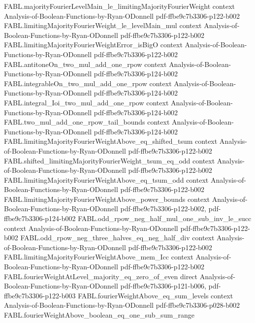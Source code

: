 \begin{theorem}
\proofstep
  {FABL.majorityFourierLevelMain_le_limitingMajorityFourierWeight}
  {context}
  {Analysis-of-Boolean-Functions-by-Ryan-ODonnell}
  {pdf-ffbe9c7b3306-p122-b002}
\proofstep
  {FABL.limitingMajorityFourierWeight_le_levelMain_mul}
  {context}
  {Analysis-of-Boolean-Functions-by-Ryan-ODonnell}
  {pdf-ffbe9c7b3306-p122-b002}
\proofstep
  {FABL.limitingMajorityFourierWeightError_isBigO}
  {context}
  {Analysis-of-Boolean-Functions-by-Ryan-ODonnell}
  {pdf-ffbe9c7b3306-p122-b002}
\proofstep
  {FABL.antitoneOn_two_mul_add_one_rpow}
  {context}
  {Analysis-of-Boolean-Functions-by-Ryan-ODonnell}
  {pdf-ffbe9c7b3306-p124-b002}
\proofstep
  {FABL.integrableOn_two_mul_add_one_rpow}
  {context}
  {Analysis-of-Boolean-Functions-by-Ryan-ODonnell}
  {pdf-ffbe9c7b3306-p124-b002}
\proofstep
  {FABL.integral_Ioi_two_mul_add_one_rpow}
  {context}
  {Analysis-of-Boolean-Functions-by-Ryan-ODonnell}
  {pdf-ffbe9c7b3306-p124-b002}
\proofstep
  {FABL.two_mul_add_one_rpow_tail_bounds}
  {context}
  {Analysis-of-Boolean-Functions-by-Ryan-ODonnell}
  {pdf-ffbe9c7b3306-p124-b002}
\proofstep
  {FABL.limitingMajorityFourierWeightAbove_eq_shifted_tsum}
  {context}
  {Analysis-of-Boolean-Functions-by-Ryan-ODonnell}
  {pdf-ffbe9c7b3306-p122-b002}
\proofstep
  {FABL.shifted_limitingMajorityFourierWeight_tsum_eq_odd}
  {context}
  {Analysis-of-Boolean-Functions-by-Ryan-ODonnell}
  {pdf-ffbe9c7b3306-p122-b002}
\proofstep
  {FABL.limitingMajorityFourierWeightAbove_eq_tsum_odd}
  {context}
  {Analysis-of-Boolean-Functions-by-Ryan-ODonnell}
  {pdf-ffbe9c7b3306-p122-b002}
\proofstep
  {FABL.limitingMajorityFourierWeightAbove_power_bounds}
  {context}
  {Analysis-of-Boolean-Functions-by-Ryan-ODonnell}
  {pdf-ffbe9c7b3306-p122-b002,
    pdf-ffbe9c7b3306-p124-b002}
\proofstep
  {FABL.odd_rpow_neg_half_mul_one_sub_inv_le_succ}
  {context}
  {Analysis-of-Boolean-Functions-by-Ryan-ODonnell}
  {pdf-ffbe9c7b3306-p122-b002}
\proofstep
  {FABL.odd_rpow_neg_three_halves_eq_neg_half_div}
  {context}
  {Analysis-of-Boolean-Functions-by-Ryan-ODonnell}
  {pdf-ffbe9c7b3306-p122-b002}
\proofstep
  {FABL.limitingMajorityFourierWeightAbove_mem_Icc}
  {context}
  {Analysis-of-Boolean-Functions-by-Ryan-ODonnell}
  {pdf-ffbe9c7b3306-p122-b002}
\proofstep
  {FABL.fourierWeightAtLevel_majority_eq_zero_of_even}
  {direct}
  {Analysis-of-Boolean-Functions-by-Ryan-ODonnell}
  {pdf-ffbe9c7b3306-p121-b006,
    pdf-ffbe9c7b3306-p122-b003}
\proofstep
  {FABL.fourierWeightAbove_eq_sum_levels}
  {context}
  {Analysis-of-Boolean-Functions-by-Ryan-ODonnell}
  {pdf-ffbe9c7b3306-p028-b002}
\proofstep
  {FABL.fourierWeightAbove_boolean_eq_one_sub_sum_range}

\end{theorem}
